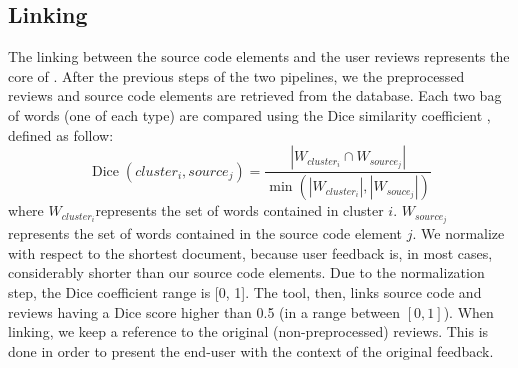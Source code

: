 %
%
\subsection{Linking}
The linking between the source code elements and the user reviews represents the core of \tool{}. After the previous steps of the two pipelines, we the preprocessed reviews and source code elements are retrieved from the database.
Each two bag of words (one of each type) are compared using the Dice similarity coefficient \cite{dice1945measures}, defined as follow:
\begin{equation*}
	\operatorname{Dice}\left(\mathit{cluster}_{i}, \mathit{source}_{j}\right) = \frac{\left|\mathit{W}_{\mathit{cluster}_{i}} \cap \mathit{W}_{\mathit{source}_{j}}\right|}{\min\left(\left|\mathit{W}_{\mathit{cluster}_{i}}\right|, \left|\mathit{W}_{\mathit{souce}_{j}}\right|\right)}
\end{equation*}
where $\mathit{W}_{\mathit{cluster}_{i}}$represents the set of words contained in cluster $i$. $\mathit{W}_{\mathit{source}_{j}}$ represents the set of words contained in the source code element $j$.
We normalize with respect to the shortest document, because user feedback is, in most cases, considerably shorter than our source code elements. Due to the normalization step, the Dice coefficient range is [0, 1].
The tool, then, links source code and reviews having a Dice score higher than 0.5 (in a range between $\left[0, 1\right]$). When linking, we keep a reference to the original (non-preprocessed) reviews. This is done in order to present the end-user with the context of the original feedback.
